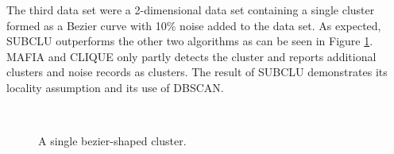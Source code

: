 The third data set were a 2-dimensional data set containing a single cluster formed as a Bezier curve with 10\% noise added to the data set. As expected, SUBCLU outperforms the other two algorithms as can be seen in Figure \ref{fig:accuracy_bezier}. MAFIA and CLIQUE only partly detects the cluster and reports additional clusters and noise records as clusters. The result of SUBCLU demonstrates its locality assumption and its use of DBSCAN.
\begin{figure}[H]
    \vspace*{-0.5cm}
    \centering
    ~~~~
    ~~~~
    \caption{A single bezier-shaped cluster.}
    \label{fig:accuracy_bezier}
\end{figure}

